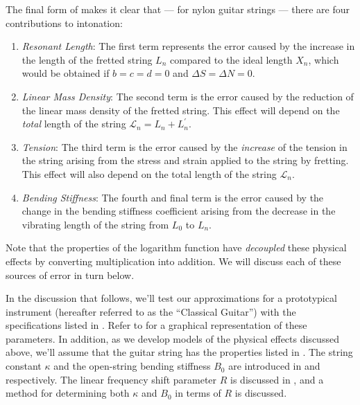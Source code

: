 The final form of  makes it clear that --- for nylon guitar strings --- there are four contributions to intonation:
 \begin{enumerate}
  \item
   \emph{Resonant Length}: The first term represents the error caused by the increase in the length of the fretted string $L_n$ compared to the ideal length $X_n$, which would be obtained if $b = c = d = 0$ and $\Delta S = \Delta N = 0$.
  \item
   \emph{Linear Mass Density}: The second term is the error caused by the reduction of the linear mass density of the fretted string. This effect will depend on the \emph{total} length of the string $\mathcal{L}_n = L_n + L^\prime_n$.
  \item
   \emph{Tension}: The third term is the error caused by the \emph{increase} of the tension in the string arising from the stress and strain applied to the string by fretting. This effect will also depend on the total length of the string $\mathcal{L}_n$.
  \item
   \emph{Bending Stiffness}: The fourth and final term is the error caused by the change in the bending stiffness coefficient arising from the decrease in the vibrating length of the string from $L_0$ to $L_n$.
 \end{enumerate}
Note that the properties of the logarithm function have \emph{decoupled} these physical effects by converting multiplication into addition. We will discuss each of these sources of error in turn below.

In the discussion that follows, we'll test our approximations for a prototypical instrument (hereafter referred to as the ``Classical Guitar'') with the specifications listed in . Refer to  for a graphical representation of these parameters. In addition, as we develop models of the physical effects discussed above, we'll assume that the guitar string has the properties listed in . The string constant $\kappa$ and the open-string bending stiffness $B_0$ are introduced in  and  respectively. The linear frequency shift parameter $R$ is discussed in , and a method for determining both $\kappa$ and $B_0$ in terms of $R$ is discussed.

